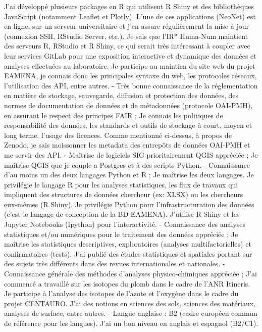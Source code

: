 J'ai développé plusieurs packages en R qui utilisent R Shiny et des bibliothèques JavaScript (notamment Leaflet et Plotly).
L'une de ces applications (NeoNet) est en ligne, sur un serveur universitaire et j'en assure régulièrement la mise à jour
(connexion SSH, RStudio Server, etc.). Je sais que l'IR* Huma-Num maintient des serveurs R, RStudio et R Shiny, ce qui serait
très intéressant à coupler avec leur services GitLab pour une exposition interactive et dynamique des données et analyses
effectuées au laboratoire. Je participe au maintien du site web du projet EAMENA, je connais donc les principales syntaxe du
web, les protocoles réseaux, l'utilisation des API, entre autres.
- Très bonne connaissance de la réglementation en matière de stockage, sauvegarde, diffusion et protection des données,
des normes de documentation de données et de métadonnées (protocole OAI-PMH), en assurant le respect des principes
FAIR ;
Je connais les politiques de responsabilité des données, les standards et outils de stockage à court, moyen et long terme,
l'usage des licences. Comme mentionné ci-dessus, à propos de Zenodo, je sais moissonner les metadata des entrepôts de
données OAI-PMH et me servir des API.
- Maîtrise de logiciels SIG prioritairement QGIS appréciée ;
Je maîtrise QGIS que je couple a Postgres et à des scripts Python. 
- Connaissance d'au moins un des deux langages Python et R ;
Je maîtrise les deux langages. Je privilégie le langage R pour les analyses statistiques, les flux de travaux qui impliquent
des structures de données chercheur (ex: XLSX) ou les chercheurs eux-mêmes (R Shiny). Je privilégie Python pour
l'infrastructuration des données (c'est le langage de conception de la BD EAMENA). J'utilise R Shiny et les Jupyter Notebooks
(Ipython) pour l'interactivité.
- Connaissance des analyses statistiques et/ou numériques pour le traitement des données appréciée ;
Je maîtrise les statistiques descriptives, exploratoires (analyses multifactorielles) et confirmatoires (tests). J'ai publié des
études statistiques et spatiales portant sur des sujets très différents dans des revues internationales et nationales.
- Connaissance générale des méthodes d'analyses physico-chimiques appréciée ;
J'ai commencé a travaillé sur les isotopes du plomb dans le cadre de l'ANR Itineris. Je participe à l'analyse des isotopes de
l'azote et l'oxygène dans le cadre du projet CENTAURO. J'ai des notions en sciences des sols, sciences des matériaux,
analyses de surface, entre autres.
- Langue anglaise : B2 (cadre européen commun de référence pour les langues).
J'ai un bon niveau en anglais et espagnol (B2/C1).
